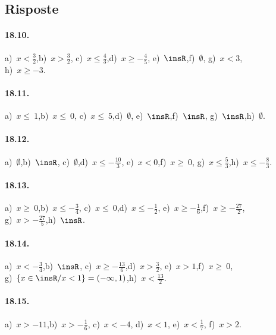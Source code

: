 \subsection{Risposte}
\paragraph{18.10.} a)~$x<\frac{3}{2}$,\quad b)~$x>\frac{3}{2}$,\quad
c)~$x\le \frac{4}{3}$,\quad d)~$x\ge -{\frac{4}{5}}$,\quad
e)~$\insR$,\quad f)~$\emptyset $,\quad
g)~$x<3$,\quad \protect\\ h)~$x\ge -3$.

\paragraph{18.11.} a)~$x\le~1$,\quad b)~$x\le~0$,\quad
c)~$x\le~5$,\quad d)~$\emptyset $,\quad
e)~$\insR$,\quad f)~$\insR$,\quad
g)~$\insR $,\quad h)~$\emptyset $.

\paragraph{18.12.} a)~$\emptyset $,\quad b)~$\insR$,\quad
c)~$\emptyset $,\quad d)~$x\le -{\frac{10}{3}}$,\quad
e)~$x<0$,\quad f)~$x\ge~0$,\quad
g)~$x\le \frac{5}{3}$,\quad h)~$x\le -{\frac{8}{3}}$.

\paragraph{18.13.} a)~$x\ge~0$,\quad b)~$x\le -{\frac{3}{4}}$,\quad
c)~$x\le~0$,\quad d)~$x\le -{\frac{1}{2}}$,\quad
e)~$x\ge -{\frac{1}{6}}$,\quad f)~$x\ge -{\frac{27}{2}}$,\quad
\protect\\g)~$x>-{\frac{27}{5}}$,\quad h)~$\insR$.

\paragraph{18.14.} a)~$x<-{\frac{3}{4}}$,\quad b)~$\insR$,\quad
c)~$x\ge -{\frac{13}{6}}$,\quad d)~$x>\frac{3}{2}$,\quad
e)~$x>1$,\quad f)~$x\ge~0$,\quad\protect\\
g)~$\{x\in\insR/x<1\}=(-\infty,1)$,\quad h)~$x<\frac{13}{2}$.

\paragraph{18.15.} a)~$x>-11$,\quad b)~$x>-{\frac{1}{6}}$,\quad
c)~$x<-4$, \quad d)~$x<1$, \quad e)~$x<\frac{1}{7}$, \quad f)~$x>2$.

